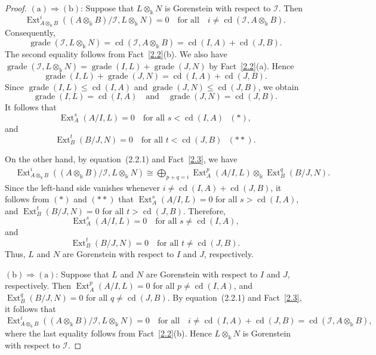 \documentclass[10pt,a4paper]{amsart}
\numberwithin{equation}{theorem}
\theoremstyle{definition}
\theoremstyle{fact}
\theoremstyle{conjecture}
\newcommand{\grade}{\operatorname{grade}}
\newcommand{\cd}{\operatorname{cd}}
\newcommand{\Ext}{\operatorname{Ext}}
\begin{document}
\begin{proof}
$(\mathrm{a})\Rightarrow(\mathrm{b})$:
Suppose that $L\otimes_{\Bbbk} N$ is Gorenstein with respect to
$\mathcal{I}$. Then
\[
\Ext^i_{A\otimes_{\Bbbk}B}
\left((A\otimes_{\Bbbk}B)/\mathcal{I},L\otimes_{\Bbbk}N\right)=0
\quad\text{for all}\quad
i\neq \cd(\mathcal{I},A\otimes_{\Bbbk}B).
\]
 Consequently,
\[
\grade(\mathcal{I},L\otimes_{\Bbbk}N)
=\cd(\mathcal{I},A\otimes_{\Bbbk}B)
=\cd(I,A)+\cd(J,B).
\]
 The second equality follows from Fact~\ref{2.2}(b). We also have
$
\grade(\mathcal{I},L\otimes_{\Bbbk}N)
=\grade(I,L)+\grade(J,N)
$
by Fact~\ref{2.2}(a).
Hence
\[
\grade(I,L)+\grade(J,N)
=\cd(I,A)+\cd(J,B).
\]
Since  $\grade(I,L)\leq\cd(I,A)$ and $\grade(J,N)\leq\cd(J,B)$,
we obtain
\[
\grade(I,L)=\cd(I,A)
\quad\text{and}\quad
\grade(J,N)=\cd(J,B).
\]
It follows that
\[
\Ext^s_A(A/I,L)=0
\quad\text{for all }s<\cd(I,A) \  \  \   (*),
\]
and
\[
\Ext^t_B(B/J,N)=0
\quad\text{for all }t<\cd(J,B) \  \  \   (**).
\]

On the other hand, by equation~(2.2.1) and Fact~\ref{2.3}, we have
\[
\begin{aligned}
&\Ext^i_{A\otimes_{\Bbbk}B}
\left(
(A\otimes_{\Bbbk}B)/\mathcal{I},
L\otimes_{\Bbbk}N
\right)
\cong
\bigoplus_{p+q=i}
\Ext^p_A(A/I,L)\otimes_{\Bbbk}
\Ext^q_B(B/J,N).
\end{aligned}
\]
Since the left-hand side vanishes whenever
$i\neq \cd(I,A)+\cd(J,B)$, it follows from $(*)$ and $(**)$ that
$\Ext^s_A(A/I,L)=0$ for all $s>\cd(I,A)$,
and
$\Ext^t_B(B/J,N)=0$ for all $t>\cd(J,B)$.
Therefore,
\[
\Ext^s_A(A/I,L)=0
\quad\text{for all }s\neq \cd(I,A),
\]
and
\[
\Ext^t_B(B/J,N)=0
\quad\text{for all }t\neq \cd(J,B).
\]
Thus, $L$ and $N$ are Gorenstein with respect to $I$ and $J$,
respectively.

$(\mathrm{b})\Rightarrow(\mathrm{a})$:
Suppose that $L$ and $N$ are Gorenstein with respect to $I$ and $J$,
respectively. Then
$\Ext^p_A(A/I,L)=0$ for all $p\neq \cd(I,A)$,
and
$\Ext^q_B(B/J,N)=0$ for all $q\neq \cd(J,B)$.
By equation~(2.2.1) and Fact~\ref{2.3}, it follows that
\[
\Ext^i_{A\otimes_{\Bbbk}B}
\left(
(A\otimes_{\Bbbk}B)/\mathcal{I},
L\otimes_{\Bbbk}N
\right)=0
\quad\text{for all}\quad
i\neq \cd(I,A)+\cd(J,B)
=\cd(\mathcal{I},A\otimes_{\Bbbk}B),
\]
where the last equality follows from Fact~\ref{2.2}(b).
Hence $L\otimes_{\Bbbk}N$ is Gorenstein with respect to
$\mathcal{I}$.
\end{proof}
\end{document}
